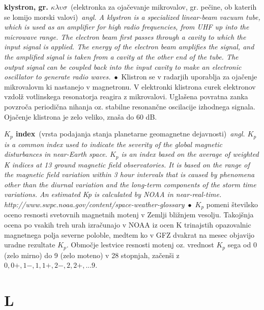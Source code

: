 \documentclass[10pt,a4paper,twoside]{article} %
\newcommand{\entry}[4]{\markboth{#1}{#1}\textbf{#1}\ {(#2)}\ \textit{#3}\ $\bullet$\ {#4}}  %
\begin{document}
\begin{multicols}{2}
	
	\entry{klystron, gr. $\kappa \lambda \upsilon \sigma$}{elektronka za ojačevanje mikrovalov, gr. pečine, ob katerih se lomijo morski valovi}{angl. A klystron is a specialized linear-beam vacuum tube, which is used as an amplifier for high radio frequencies, from UHF up into the microwave range. The electron beam first passes through a cavity to which the input signal is applied. The energy of the electron beam amplifies the signal, and the amplified signal is taken from a cavity at the other end of the tube. The output signal can be coupled back into the input cavity to make an electronic oscillator to generate radio waves.}{Klistron se v radarjih uporablja za ojačenje mikrovalovm ki nastanejo v magnetronu. V elektronki klistrona curek elektronov vzdolž votlinskega resonatorja reagira z mikrovalovi. Uglašena povratna zanka povzroča periodična nihanja oz. stabilne resonančne oscilacije izhodnega signala. Ojačenje klistrona je zelo veliko, znaša do 60 dB.}

	
	\entry{$ K_p $ index}{vrsta podajanja stanja planetarne geomagnetne dejavnosti}{angl. $ K_p $ is a common index used to indicate the severity of the global magnetic disturbances in near-Earth space. $ K_p $ is an index based on the average of weighted K indices at 13 ground magnetic field observatories. It is based on the range of the magnetic field variation within 3 hour intervals that is caused by phenomena other than the diurnal variation and the long-term components of the storm time variations. An estimated Kp is calculated by NOAA in near-real-time. {\scriptsize http://www.swpc.noaa.gov/content/space-weather-glossary}}{$ K_p $ pomeni številsko oceno resnosti svetovnih magnetnih motenj v Zemlji bližnjem vesolju. Takojšnja ocena po vsakih treh urah izračunajo v NOAA iz ocen K trinajstih opazovalnic magnetnega polja severne poloble, medtem ko v GFZ dvakrat na mesec objavijo uradne rezultate $ K_p $. Območje lestvice resnosti motenj oz. vrednost $ K_p $ sega od 0 (zelo mirno) do 9 (zelo moteno) v 28 stopnjah, začenši z $ 0, 0+, 1-, 1, 1+, 2-, 2, 2+,...9$.}
	
\end{multicols}	



\section*{L}
\end{document}
